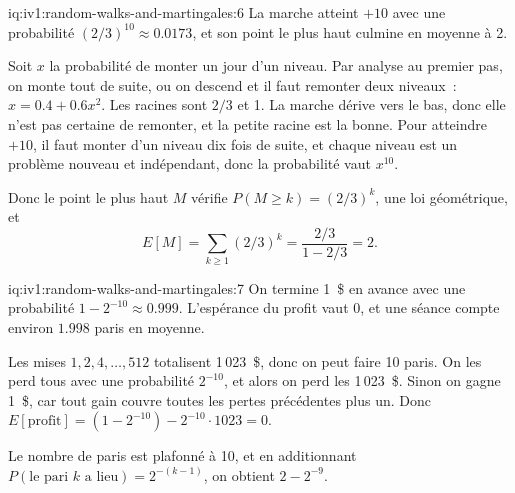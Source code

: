 \begin{solution}{iq:iv1:random-walks-and-martingales:6}
La marche atteint $+10$ avec une probabilité $(2/3)^{10} \approx 0.0173$, et son point le plus haut culmine en moyenne à 2.

Soit $x$ la probabilité de monter un jour d'un niveau. Par analyse au premier pas, on monte tout de suite, ou on descend et il faut remonter deux niveaux~: $x = 0.4 + 0.6 x^2$. Les racines sont $2/3$ et 1. La marche dérive vers le bas, donc elle n'est pas certaine de remonter, et la petite racine est la bonne. Pour atteindre $+10$, il faut monter d'un niveau dix fois de suite, et chaque niveau est un problème nouveau et indépendant, donc la probabilité vaut $x^{10}$.

Donc le point le plus haut $M$ vérifie $P(M \ge k) = (2/3)^k$, une loi géométrique, et
\[
E[M] = \sum_{k \ge 1} (2/3)^k = \frac{2/3}{1 - 2/3} = 2.
\]
\end{solution}

\begin{solution}{iq:iv1:random-walks-and-martingales:7}
On termine 1~\$ en avance avec une probabilité $1 - 2^{-10} \approx 0.999$. L'espérance du profit vaut 0, et une séance compte environ $1.998$ paris en moyenne.

Les mises $1, 2, 4, \dots, 512$ totalisent 1\,023~\$, donc on peut faire 10 paris. On les perd tous avec une probabilité $2^{-10}$, et alors on perd les 1\,023~\$. Sinon on gagne 1~\$, car tout gain couvre toutes les pertes précédentes plus un. Donc $E[\text{profit}] = (1 - 2^{-10}) - 2^{-10} \cdot 1023 = 0$.

Le nombre de paris est plafonné à 10, et en additionnant $P(\text{le pari } k \text{ a lieu}) = 2^{-(k - 1)}$, on obtient $2 - 2^{-9}$.

\end{solution}

